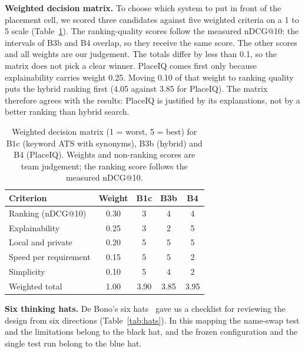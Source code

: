 \documentclass[conference]{IEEEtran}
\begin{document}
\textbf{Weighted decision matrix.} To choose which system to put in front of the placement cell, we scored three candidates against five weighted criteria on a 1 to 5 scale (Table~\ref{tab:wdm}). The ranking-quality scores follow the measured nDCG@10: the intervals of B3b and B4 overlap, so they receive the same score. The other scores and all weights are our judgement. The totals differ by less than 0.1, so the matrix does not pick a clear winner. PlaceIQ comes first only because explainability carries weight 0.25. Moving 0.10 of that weight to ranking quality puts the hybrid ranking first (4.05 against 3.85 for PlaceIQ). The matrix therefore agrees with the results: PlaceIQ is justified by its explanations, not by a better ranking than hybrid search.

\begin{table}[!t]
\caption{Weighted decision matrix (1 = worst, 5 = best) for B1c (keyword ATS with synonyms), B3b (hybrid) and B4 (PlaceIQ). Weights and non-ranking scores are team judgement; the ranking score follows the measured nDCG@10.}
\label{tab:wdm}
\centering\footnotesize
\begin{tabular}{lcccc}
\toprule
Criterion & Weight & B1c & B3b & B4\\
\midrule
Ranking (nDCG@10) & 0.30 & 3 & 4 & 4\\
Explainability & 0.25 & 3 & 2 & 5\\
Local and private & 0.20 & 5 & 5 & 5\\
Speed per requirement & 0.15 & 5 & 5 & 2\\
Simplicity & 0.10 & 5 & 4 & 2\\
\midrule
Weighted total & 1.00 & 3.90 & 3.85 & 3.95\\
\bottomrule
\end{tabular}
\end{table}

\textbf{Six thinking hats.} De Bono's six hats~\cite{debono1985sixhats} gave us a checklist for reviewing the design from six directions (Table~\ref{tab:hats}). In this mapping the name-swap test and the limitations belong to the black hat, and the frozen configuration and the single test run belong to the blue hat.
\end{document}
